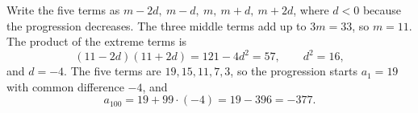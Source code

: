 Write the five terms as $m-2d,\ m-d,\ m,\ m+d,\ m+2d$, where $d<0$ because the progression decreases. The three middle terms add up to $3m=33$, so $m=11$. The product of the extreme terms is
\[
(11-2d)(11+2d)=121-4d^2=57,\qquad d^2=16,
\]
and $d=-4$. The five terms are $19,15,11,7,3$, so the progression starts $a_1=19$ with common difference $-4$, and
\[
a_{100}=19+99\cdot(-4)=19-396=\boxed{-377}.
\]
